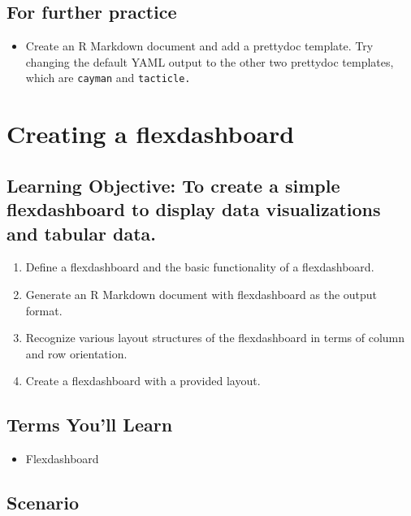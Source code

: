 \documentclass[
  krantz2]{krantz}
\providecommand{\tightlist}{%
  \setlength{\itemsep}{0pt}\setlength{\parskip}{0pt}}
\begin{document}
\hypertarget{for-further-practice}{%
\section{For further practice}\label{for-further-practice}}

\begin{itemize}
\tightlist
\item
  Create an R Markdown document and add a prettydoc template. Try changing the default YAML output to the other two prettydoc templates, which are \texttt{cayman} and \texttt{tacticle.}
\end{itemize}

\hypertarget{flexdashboard}{%
\chapter{Creating a flexdashboard}\label{flexdashboard}}

\hypertarget{flexdashboard-los}{%
\section{Learning Objective: To create a simple flexdashboard to display data visualizations and tabular data.}\label{flexdashboard-los}}

\begin{enumerate}
\def\labelenumi{\arabic{enumi}.}
\tightlist
\item
  Define a flexdashboard and the basic functionality of a flexdashboard.
\item
  Generate an R Markdown document with flexdashboard as the output format.
\item
  Recognize various layout structures of the flexdashboard in terms of column and row orientation.
\item
  Create a flexdashboard with a provided layout.
\end{enumerate}

\hypertarget{flexdashboard-terms}{%
\section{Terms You'll Learn}\label{flexdashboard-terms}}

\begin{itemize}
\tightlist
\item
  Flexdashboard
\end{itemize}

\hypertarget{flexdashboard-scenario}{%
\section{Scenario}\label{flexdashboard-scenario}}
\end{document}

